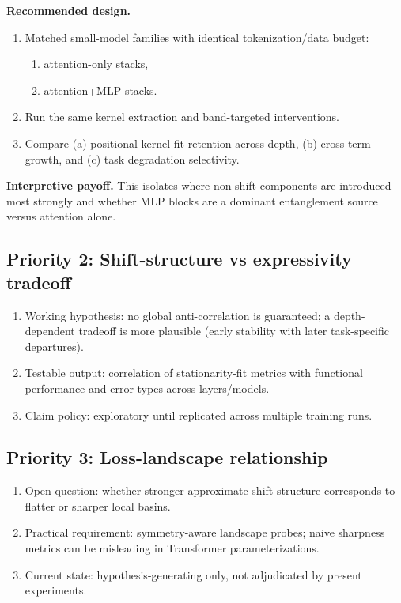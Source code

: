 \documentclass[11pt]{article}
\begin{document}
\textbf{Recommended design.}
\begin{enumerate}[leftmargin=*]
  \item Matched small-model families with identical tokenization/data budget:
  \begin{enumerate}
    \item attention-only stacks,
    \item attention+MLP stacks.
  \end{enumerate}
  \item Run the same kernel extraction and band-targeted interventions.
  \item Compare (a) positional-kernel fit retention across depth, (b) cross-term growth, and (c) task degradation selectivity.
\end{enumerate}

\textbf{Interpretive payoff.} This isolates where non-shift components are introduced most strongly and whether MLP blocks are a dominant entanglement source versus attention alone.

\subsection*{Priority 2: Shift-structure vs expressivity tradeoff}
\begin{enumerate}[leftmargin=*]
  \item Working hypothesis: no global anti-correlation is guaranteed; a depth-dependent tradeoff is more plausible (early stability with later task-specific departures).
  \item Testable output: correlation of stationarity-fit metrics with functional performance and error types across layers/models.
  \item Claim policy: exploratory until replicated across multiple training runs.
\end{enumerate}

\subsection*{Priority 3: Loss-landscape relationship}
\begin{enumerate}[leftmargin=*]
  \item Open question: whether stronger approximate shift-structure corresponds to flatter or sharper local basins.
  \item Practical requirement: symmetry-aware landscape probes; naive sharpness metrics can be misleading in Transformer parameterizations.
  \item Current state: hypothesis-generating only, not adjudicated by present experiments.
\end{enumerate}
\end{document}
